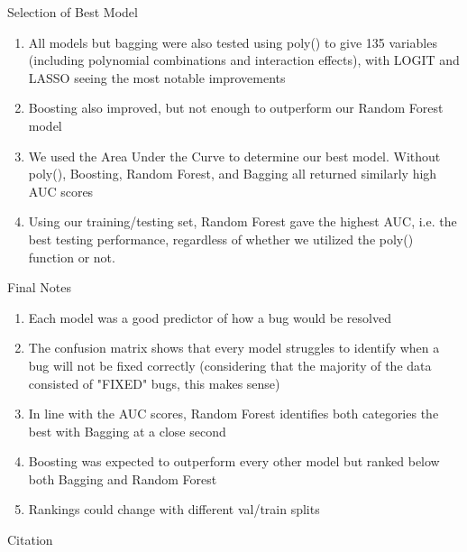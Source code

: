 \documentclass[notes,compress,serif,professionalfont]{beamer}
\begin{document}
\begin{frame}{Selection of Best Model}
    \begin{enumerate}[<+->]
        \item All models but bagging were also tested using poly() to give 135 variables (including polynomial combinations and interaction effects), with LOGIT and LASSO seeing the most notable improvements
        \item Boosting also improved, but not enough to outperform our Random Forest model
        \item We used the Area Under the Curve to determine our best model. Without poly(), Boosting, Random Forest, and Bagging all returned similarly high AUC scores
        \item Using our training/testing set, Random Forest gave the highest AUC, i.e. the best testing performance, regardless of whether we utilized the poly() function or not.
    \end{enumerate}
\end{frame}

\begin{frame}{Final Notes}
    \begin{enumerate}[<+->]
        \item Each model was a good predictor of how a bug would be resolved
        \item The confusion matrix shows that every model struggles to identify when a bug will not be fixed correctly (considering that the majority of the data consisted of "FIXED" bugs, this makes sense)
        \item In line with the AUC scores, Random Forest identifies both categories the best with Bagging at a close second
        \item Boosting was expected to outperform every other model but ranked below both Bagging and Random Forest
        \item Rankings could change with different val/train splits
    \end{enumerate}
\end{frame}

\begin{frame}{Citation}
    
    
\end{frame}
        
\end{document}
